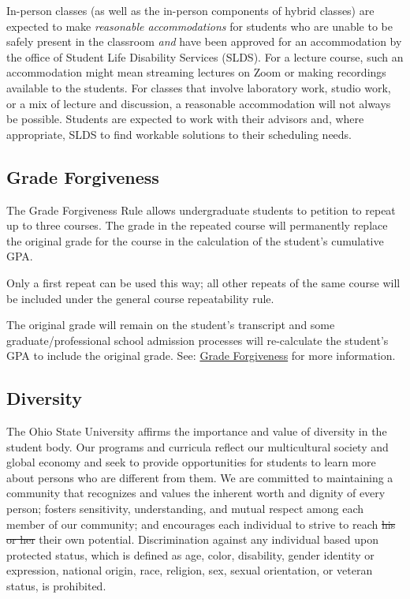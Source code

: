 In-person classes (as well as the in-person components of hybrid classes) are expected to make \emph{reasonable accommodations} for students who are unable to be safely present in the classroom \emph{and} have been approved for an accommodation by the office of Student Life Disability Services (SLDS). For a lecture course, such an accommodation might mean streaming lectures on Zoom or making recordings available to the students. For classes that involve laboratory work, studio work, or a mix of lecture and discussion, a reasonable accommodation will not always be possible. Students are expected to work with their advisors and, where appropriate, SLDS to find workable solutions to their scheduling needs.

\subsection{Grade Forgiveness}

The Grade Forgiveness Rule allows undergraduate students to petition to repeat up to three courses. The grade in the repeated course will permanently replace the original grade for the course in the calculation of the student's cumulative GPA.

Only a first repeat can be used this way; all other repeats of the same course will be included under the general course repeatability rule.

The original grade will remain on the student's transcript and some graduate/professional school admission processes will re-calculate the student's GPA to include the original grade. See: \href{https://advising.osu.edu/grade-forgiveness-0}{Grade Forgiveness} for more information.

\subsection{Diversity}

The Ohio State University affirms the importance and value of diversity in the student body. Our programs and curricula reflect our multicultural society and global economy and seek to provide opportunities for students to learn more about persons who are different from them. We are committed to maintaining a community that recognizes and values the inherent worth and dignity of every person; fosters sensitivity, understanding, and mutual respect among each member of our community; and encourages each individual to strive to reach \sout{his or her} their own potential. Discrimination against any individual based upon protected status, which is defined as age, color, disability, gender identity or expression, national origin, race, religion, sex, sexual orientation, or veteran status, is prohibited.

